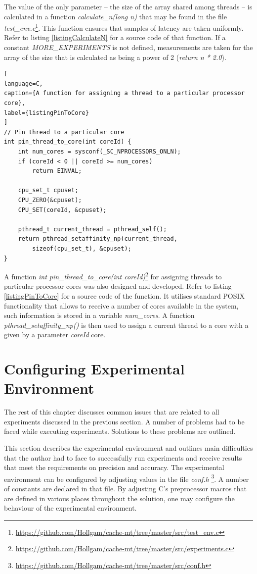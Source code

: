 The value of the only parameter -- the size of the array shared among threads -- is calculated in a function \textit{calculate\_n(long n)} that may be found in the file \textit{test\_env.c}\footnote{\url{https://github.com/Hollgam/cache-mt/tree/master/src/test\_env.c}}. This function ensures that samples of latency are taken uniformly. Refer to listing \ref{listingCalculateN} for a source code of that function. If a constant \textit{MORE\_EXPERIMENTS} is not defined, measurements are taken for the array of the size that is calculated as being a power of 2 (\textit{return n * 2.0}).

\begin{lstlisting}[
language=C,
caption={A function for assigning a thread to a particular processor core},
label={listingPinToCore}
]
// Pin thread to a particular core
int pin_thread_to_core(int coreId) {
	int num_cores = sysconf(_SC_NPROCESSORS_ONLN);
	if (coreId < 0 || coreId >= num_cores)
		return EINVAL;

	cpu_set_t cpuset;
	CPU_ZERO(&cpuset);
	CPU_SET(coreId, &cpuset);

	pthread_t current_thread = pthread_self();
	return pthread_setaffinity_np(current_thread,
	    sizeof(cpu_set_t), &cpuset);
}
\end{lstlisting}

A function \textit{int pin\_thread\_to\_core(int coreId)}\footnote{\url{https://github.com/Hollgam/cache-mt/tree/master/src/experiments.c}} for assigning threads to particular processor cores was also designed and developed. Refer to listing \ref{listingPinToCore} for a source code of the function. It utilises standard POSIX functionality that allows to receive a number of cores available in the system, such information is stored in a variable \textit{num\_cores}. A function \textit{pthread\_setaffinity\_np()} is then used to assign a current thread to a core with a given by a parameter \textit{coreId} core.

\section{Configuring Experimental Environment}
\label{design_env}

The rest of this chapter discusses common issues that are related to all experiments discussed in the previous section. A number of problems had to be faced while executing experiments. Solutions to these problems are outlined.

This section describes the experimental environment and outlines main difficulties that the author had to face to successfully run experiments and receive results that meet the requirements on precision and accuracy. The experimental environment can be configured by adjusting values in the file \textit{conf.h} \footnote{\url{https://github.com/Hollgam/cache-mt/tree/master/src/conf.h}}. A number of constants are declared in that file. By adjusting C's preprocessor macros that are defined in various places throughout the solution, one may configure the behaviour of the experimental environment.

